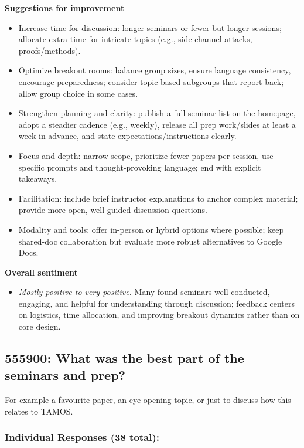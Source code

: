 \documentclass[a4paper]{report}
\begin{document}
\textbf{Suggestions for improvement}
\begin{itemize}
\item Increase time for discussion: longer seminars or fewer-but-longer sessions; allocate extra time for intricate topics (e.g., side-channel attacks, proofs/methods).
\item Optimize breakout rooms: balance group sizes, ensure language consistency, encourage preparedness; consider topic-based subgroups that report back; allow group choice in some cases.
\item Strengthen planning and clarity: publish a full seminar list on the homepage, adopt a steadier cadence (e.g., weekly), release all prep work/slides at least a week in advance, and state expectations/instructions clearly.
\item Focus and depth: narrow scope, prioritize fewer papers per session, use specific prompts and thought-provoking language; end with explicit takeaways.
\item Facilitation: include brief instructor explanations to anchor complex material; provide more open, well-guided discussion questions.
\item Modality and tools: offer in-person or hybrid options where possible; keep shared-doc collaboration but evaluate more robust alternatives to Google Docs.
\end{itemize}

\textbf{Overall sentiment}
\begin{itemize}
\item \textit{Mostly positive to very positive.} Many found seminars well-conducted, engaging, and helpful for understanding through discussion; feedback centers on logistics, time allocation, and improving breakout dynamics rather than on core design.
\end{itemize}

\subsection{555900: What was the best part of the seminars and prep?}

For example a favourite paper, an eye-opening topic, or just to discuss how 
this relates to TAMOS.

\subsubsection{Individual Responses (38 total):}
\end{document}
